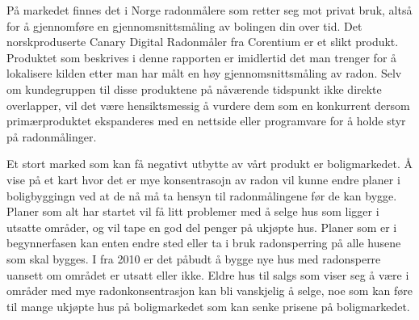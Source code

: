 På markedet finnes det i Norge radonmålere som retter seg mot privat bruk, altså for å gjennomføre en gjennomsnittsmåling av bolingen din over tid. Det norskproduserte Canary Digital Radonmåler fra Corentium er et slikt produkt. Produktet som beskrives i denne rapporten er imidlertid det man trenger for å lokalisere kilden etter man har målt en høy gjennomsnittsmåling av radon. Selv om kundegruppen til disse produktene på nåværende tidspunkt ikke direkte overlapper, vil det være hensiktsmessig å vurdere dem som en konkurrent dersom primærproduktet ekspanderes med en nettside eller programvare for å holde styr på radonmålinger.

Et stort marked som kan få negativt utbytte av vårt produkt er boligmarkedet. Å vise på et kart hvor det er mye konsentrasojn av radon vil kunne endre planer i boligbyggingn ved at de nå må ta hensyn til radonmålingene før de kan bygge. Planer som alt har startet vil få litt problemer med å selge hus som ligger i utsatte områder, og vil tape en god del penger på ukjøpte hus. Planer som er i begynnerfasen kan enten endre sted eller ta i bruk radonsperring på alle husene som skal bygges. I fra 2010 er det påbudt å bygge nye hus med radonsperre uansett om området er utsatt eller ikke. Eldre hus til salgs som viser seg å være i områder med mye radonkonsentrasjon kan bli vanskjelig å selge, noe som kan føre til mange ukjøpte hus på boligmarkedet som kan senke prisene på boligmarkedet.
